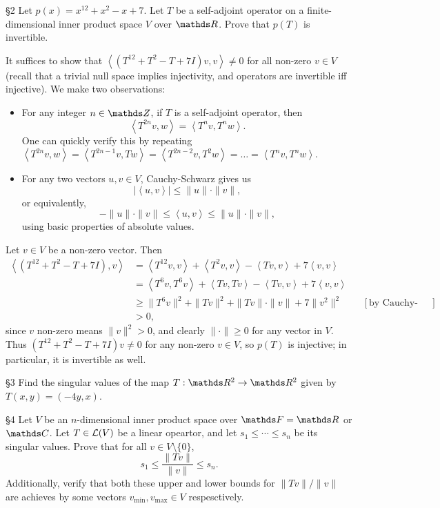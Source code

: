 \documentclass{homework}
\begin{document}
\begin{problem}{\S 2}
  Let $p(x)=x^{12}+x^2-x+7$. Let $T$ be a self-adjoint operator on a finite-dimensional inner
  product space $V$ over $\R$. Prove that $p(T)$ is invertible.
\end{problem}
\begin{solution}
  It suffices to show that $\left<(T^{12}+T^2-T+7I)v,v \right>\neq 0 $ for all non-zero $v\in V$
  (recall that a trivial null space implies injectivity, and operators are invertible iff
  injective). We make two observations:
  \begin{itemize}
    \item For any integer $n\in \Z$, if $T$ is a self-adjoint operator, then \[
        \left<T^{2n}v,w \right> =\left<T^{n}v,T^{n}w \right> 
      .\] One can quickly verify this by repeating $\left<T^{2n}v,w \right> =\left<T^{2n-1}v,Tw
      \right> =\left<T^{2n-2}v,T^2w \right> =\ldots=\left<T^{n}v,T^{n}w \right> $.
    \item For any two vectors $u,v\in V$, Cauchy-Schwarz gives us \[
      \left| \left<u,v \right> \right| \le \|u\|\cdot \|v\|
    ,\] or equivalently, \[
      -\|u\|\cdot \|v\|\le \left<u,v \right> \le \|u\|\cdot \|v\|
    ,\] using basic properties of absolute values.
  \end{itemize}

  Let $v\in V$ be a non-zero vector. Then
  \begin{align*}
    \left<\left( T^{12}+T^2-T+7I \right),v  \right> &= \left<T^{12}v,v \right> +\left<T^2v,v
    \right> -\left<Tv,v \right> +7\left<v,v \right>  \\
                                                    &= \left<T^6v,T^6v \right>+\left<Tv,Tv \right>
    -\left<Tv,v \right> +7\left<v,v \right>   \\
                                                    &\ge \|T^6v\|^2+\|Tv\|^2+\|Tv\|\cdot
    \|v\|+7\|v^2\|^2&&[\text{by Cauchy-Schwarz; see observation}]\\
    &>0
  ,\end{align*} since $v$ non-zero means $\|v\|^2>0$, and clearly $\|\cdot \|\ge 0$ for any vector
  in $V$. Thus $(T^{12}+T^2-T+7I)v\neq 0$ for any non-zero $v\in V$, so $p(T)$ is injective; in
  particular, it is invertible as well.
\end{solution}

\begin{problem}{\S 3}
  Find the singular values of the map $T:\R^2\to \R^2$ given by $T(x,y)=(-4y,x)$.
\end{problem}


\begin{problem}{\S 4}
  Let $V$ be an $n$-dimensional inner product space over $\F=\R$ or $\C$. Let $T\in \mathcal{L}(V)$ be a
  linear opeartor, and let $s_1\le \cdots\le s_n$ be its singular values. Prove that for all $v\in
  V\setminus \{ 0 \}$, \[
    s_1\le \frac{\|Tv\|}{\|v\|}\le s_n
  .\] Additionally, verify that both these upper and lower bounds for $\|Tv\|/\|v\|$ are achieves by
  some vectors $v_{\min},v_{\max}\in V$ respesctively.
\end{problem}
\end{document}
